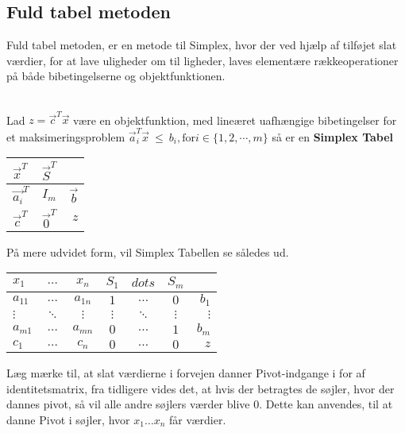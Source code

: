 \subsection{Fuld tabel metoden}
Fuld tabel metoden, er en metode til Simplex, hvor der ved hjælp af tilføjet slat værdier, for at lave uligheder om til ligheder, laves elementære rækkeoperationer på både bibetingelserne og objektfunktionen.\\
\\
\begin{defn}
Lad $z=\vec{c}^T\vec{x}$ være en objektfunktion, med lineæret uafhængige bibetingelser for et maksimeringsproblem $	\vec{a}_i^T\vec{x} \ \leq \  b_i, \text{for} i \in \{1,2,\cdots, m\}$ så er en \textbf{Simplex Tabel}\\
\begin{center}
\begin{tabular}{| l | c | r |}
  \hline
  $\vec{x}^T$&$\vec{S}^T$& \\ \hline			
  $\vec{a_i}^T$ & $I_m$ & $\vec{b}$ \\ \hline
  $\vec{c}^T$ & $\vec{0}^T$ & $z$ \\
  \hline  
\end{tabular}
\end{center}
\end{defn}
På mere udvidet form, vil Simplex Tabellen se således ud.
\begin{center}
\begin{tabular}{| l  c  c | c  c  c |r |}
  \hline	
  $x_1$&$\dots$&$x_n$&$S_1$&$dots$&$S_m$&\\ \hline		
  $a_{1 1}$ & $\dots$ & $a_{1 n}$ & $1$ & $\dots$ & $0$ & $b_1$\\
  $\vdots$ & $\ddots$ & $\vdots$ & $\vdots$ & $\ddots$ & $\vdots$ & $\vdots$\\
  $a_{m 1}$ & $\dots$ & $a_{m n}$ & $0$ & $\dots$ & $1$ & $b_m$\\ \hline
  $c_1$ & $\dots$ & $c_n$ & $0$ & $\dots$ & $0$ & $z$ \\ \hline  
\end{tabular}
\end{center}
Læg mærke til, at slat værdierne i forvejen danner Pivot-indgange i for af identitetsmatrix, fra tidligere vides det, at hvis der betragtes de søjler, hvor der dannes pivot, så vil alle andre søjlers værder blive $0$. Dette kan anvendes, til at danne Pivot i søjler, hvor $x_1\dots x_n$ får værdier.\\
